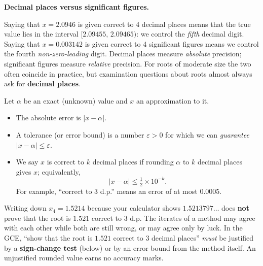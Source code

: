 \documentclass[11pt]{article}
\newcommand{\cle}[1]{{\popxbold\color{popdark}#1}}
\newcounter{popsec}
\newcounter{popsub}
\newcommand{\courssub}[1]{%
  \stepcounter{popsub}%
  \par\vspace{9pt}\noindent{\popxbold\fontsize{11.5}{13}\selectfont\color{popink}{\color{poporange}\thepopsec.\thepopsub}\hspace{6pt}#1}\par\nopagebreak\vspace{4pt}
}
\begin{document}
\courssub{The Language of Accuracy}

\textbf{Decimal places versus significant figures.}\par
Saying that $x = 2.0946$ is given \cle{correct to 4 decimal places} means that the true value lies in the interval $[2.09455,\, 2.09465)$: we control the \emph{fifth} decimal digit. Saying that $x = 0.003142$ is given \cle{correct to 4 significant figures} means we control the fourth \emph{non-zero-leading} digit. Decimal places measure \emph{absolute} precision; significant figures measure \emph{relative} precision. For roots of moderate size the two often coincide in practice, but examination questions about roots almost always ask for \textbf{decimal places}.

\begin{definition}
Let $\alpha$ be an exact (unknown) value and $x$ an approximation to it.
\begin{itemize}
\item The \cle{absolute error} is $|x - \alpha|$.
\item A \cle{tolerance} (or error bound) is a number $\varepsilon > 0$ for which we can \emph{guarantee} $|x - \alpha| \leq \varepsilon$.
\item We say $x$ is \cle{correct to $k$ decimal places} if rounding $\alpha$ to $k$ decimal places gives $x$; equivalently,
\[ |x - \alpha| \leq \tfrac{1}{2}\times 10^{-k}. \]
For example, ``correct to 3 d.p.'' means an error of at most $0.0005$.
\end{itemize}
\end{definition}

\begin{attention}
Writing down $x_4 = 1.5214$ because your calculator shows $1.5213797\ldots$ does \textbf{not} prove that the root is $1.521$ correct to 3 d.p. The iterates of a method may agree with each other while both are still wrong, or may agree only by luck. In the GCE, ``show that the root is $1.521$ correct to 3 decimal places'' \emph{must} be justified by a \textbf{sign-change test} (below) or by an error bound from the method itself. An unjustified rounded value earns no accuracy marks.
\end{attention}
\end{document}
